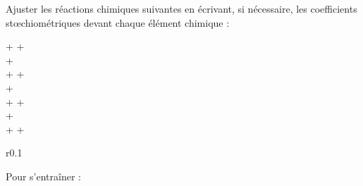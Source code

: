 \numeroQuestion
Ajuster les réactions chimiques suivantes en écrivant, si nécessaire, les coefficients stœchiométriques devant chaque élément chimique :
\newcommand{\localEcart}{16}
\begin{center}
   \sol +  \aq
  \reaction {} \ionFerII\aq +  \gaz
  \\[\localEcart pt]
   \sol +  \dioxygene\gaz
  \reaction {} \sol
  \\[\localEcart pt]
   \liq +  \dioxygene\gaz
  \reaction {} \dioxydeDeCarbone\gaz +  \eau\liq
  \\[\localEcart pt]
   \aq +  \aq
  \reaction {} \sol
  \\[\localEcart pt]
   \sol +  \eau\liq +  \dioxygene\gaz
  \reaction {} \sol
  \\[\localEcart pt]
   \sol
  \reaction {} \sol +  \eau\liq
  \\[\localEcart pt]
   \sol +  \eau\liq +  \dioxygene\gaz
  \reaction {} \sol
  \\[\localEcart pt]
\end{center}

\begin{wrapfigure}[1]{r}{0.1\linewidth}
  \centering
\end{wrapfigure}
\numeroQuestion Pour s'entraîner :